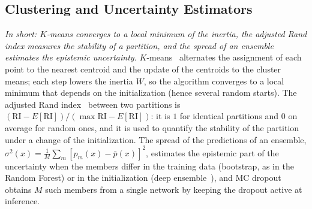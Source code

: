 \subsection{Clustering and Uncertainty Estimators}
\emph{In short: $K$-means converges to a local minimum of the inertia, the adjusted Rand index measures the stability of a partition, and the spread of an ensemble estimates the epistemic uncertainty.}
$K$-means~\cite{lloyd_kmeans} alternates the assignment of each point to the nearest centroid and the update of the centroids to the cluster means; each step lowers the inertia $W$, so the algorithm converges to a local minimum that depends on the initialization (hence several random starts). The adjusted Rand index~\cite{hubert_ari} between two partitions is $(\mathrm{RI}-E[\mathrm{RI}])/(\max\mathrm{RI}-E[\mathrm{RI}])$: it is $1$ for identical partitions and $0$ on average for random ones, and it is used to quantify the stability of the partition under a change of the initialization. The spread of the predictions of an ensemble, $\sigma^2(x)=\frac1M\sum_m[p_m(x)-\bar p(x)]^2$, estimates the epistemic part of the uncertainty when the members differ in the training data (bootstrap, as in the Random Forest) or in the initialization (deep ensemble~\cite{deep_ensembles}), and MC dropout~\cite{gal_mcdropout} obtains $M$ such members from a single network by keeping the dropout active at inference.
